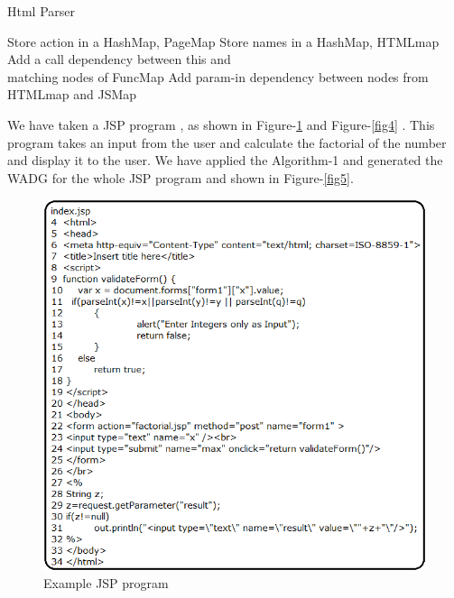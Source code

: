 \documentclass[11pt]{article}   %
\begin{document}
\begin{algorithm}
\caption{Html Parser}
\begin{algorithmic}[1]
\State Store action in a HashMap, PageMap
\EndIf
{}
\State Store names in a HashMap, HTMLmap
\State Add a call dependency between this and \\
\hspace{3cm} matching nodes of FuncMap
\EndIf
\EndIf
\State Add param-in dependency between nodes from \\
\hspace{1.5cm} HTMLmap and JSMap

\end{algorithmic}
\end{algorithm}
We have taken a JSP program , as shown in Figure-\ref{fig3}  and Figure-\ref{fig4} . This program takes an input from the user and calculate the factorial of the number and display it to the user. We have applied the Algorithm-1 and generated the WADG for the whole JSP program and shown in Figure-\ref{fig5}. 


\begin{figure}
\begin{center}
\includegraphics[scale=1]{index_l.png}
\caption{Example JSP program}
\label{fig3}
\end{center}
\end{figure}
\end{document}
